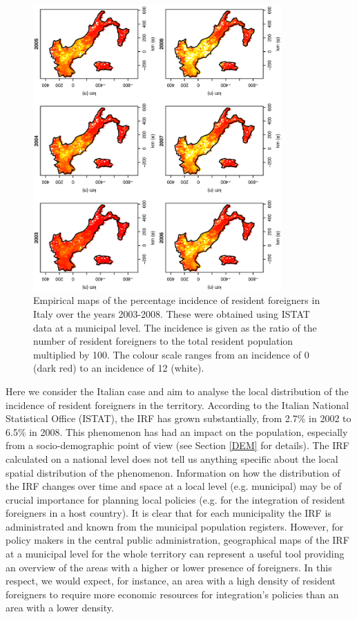 \documentclass[12pt]{article}
\theoremstyle{definition}
\theoremstyle{plain}
\begin{document}
\begin{figure}[tbp]
	\centering
		\includegraphics[width=0.85\textwidth, angle=270]{Raw.ps}
	\caption{Empirical maps of the percentage incidence of resident foreigners in Italy over the years 2003-2008. These were obtained using ISTAT data at a municipal level.	The incidence is given as the ratio of the number of resident foreigners to the total resident population multiplied by 100. The colour scale ranges from an incidence of 0 (dark red) to an incidence of 12 (white).}
	\label{Rd}
\end{figure}

Here we consider the Italian case and aim to analyse the local distribution of the incidence of resident foreigners in the territory. According to the Italian National Statistical Office (ISTAT), the IRF has grown substantially, from 2.7\% in 2002 to 6.5\% in 2008. This phenomenon has had an impact on the population, especially from a socio-demographic point of view (see Section \ref{DEM} for details). The IRF calculated on a national level does not tell us anything specific about the local spatial distribution of the phenomenon. Information on how the distribution of the IRF changes over time and space at a local level (e.g. municipal) may be of crucial importance for planning local policies (e.g. for the integration of resident foreigners in a host country). It is clear that for each municipality the IRF is administrated and known from the municipal population registers. However, for policy makers in the central public administration, geographical maps of the IRF at a municipal level for the whole territory can represent a useful tool providing an overview of the areas with a higher or lower presence of foreigners. In this respect, we would expect, for instance, an area with a high density of resident foreigners to require more economic resources for integration's policies than an area with a lower density.
\end{document}
